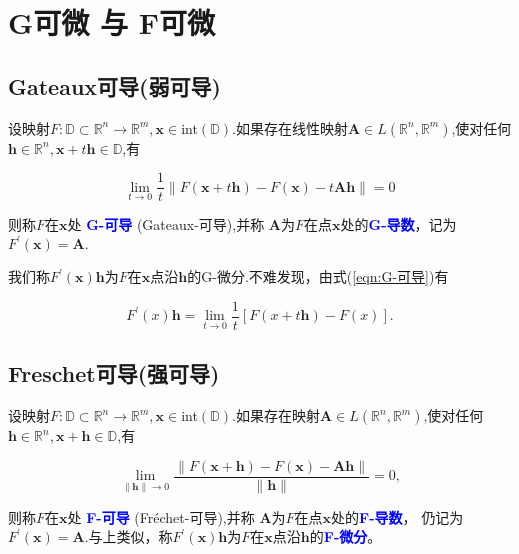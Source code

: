 \documentclass{lzureport}
\begin{document}
\section{G可微 与 F可微}
\subsection{Gateaux可导(弱可导)}
设映射$F:\mathbb{D}\subset\mathbb{R}^n\to\mathbb{R}^m,\boldsymbol{x}\in$int$(\mathbb{D}).$如果存在线性映射$\boldsymbol{A}\in L\left(\mathbb{R}^n,\mathbb{R}^m\right)$,使对任何$\boldsymbol{h}\in\mathbb{R}^n,\boldsymbol{x}+t\boldsymbol{h}\in\mathbb{D}$,有

\begin{equation}
\lim_{t\to0}\frac1t\|F(\boldsymbol{x}+t\boldsymbol{h})-F(\boldsymbol{x})-t\boldsymbol{Ah}\|=0
\end{equation}\label{eqn:G-可导}

则称$F$在$\boldsymbol x$处 \textcolor{blue}{\textbf{G-可导}} (Gateaux-可导),并称 \textcolor{YBXPurple}{$\boldsymbol A$为$F$在点$\boldsymbol x$处的}\textcolor{blue}{\textbf{G-导数}}，记为$F^\prime(\boldsymbol{x})=\boldsymbol{A}.$

我们称$F^\prime(\boldsymbol x)\boldsymbol{h}$为$F$在$\boldsymbol x$点沿$\boldsymbol h$的G-微分.不难发现，由式(\ref{eqn:G-可导})有

$$F^{\prime}(x)\boldsymbol{h}=\lim_{t\to0}\frac1t[F(x+t\boldsymbol{h})-F(x)].$$


\subsection{Freschet可导(强可导)}
设映射$F:\mathbb{D}\subset\mathbb{R}^n\to\mathbb{R}^m,\boldsymbol{x}\in$int$(\mathbb{D}).$如果存在映射$\boldsymbol{A}\in L\left(\mathbb{R}^n,\mathbb{R}^m\right)$,使对任何$\boldsymbol{h}\in\mathbb{R}^n,\boldsymbol{x}+\boldsymbol{h}\in\mathbb{D}$,有

\begin{equation}
\lim_{\|\boldsymbol{h}\|\to0}\frac{\|F(\boldsymbol{x}+\boldsymbol{h})-F(\boldsymbol{x})-\boldsymbol{Ah}\|}{\|\boldsymbol{h}\|}=0,
\end{equation}\label{eqn:F-可导}

则称$F$在$\boldsymbol x$处 \textcolor{blue}{\textbf{F-可导}} (Fréchet-可导),并称 \textcolor{YBXPurple}{$\boldsymbol A$为$F$在点$\boldsymbol x$处的}\textcolor{blue}{\textbf{F-导数}}，
仍记为$F^\prime(\boldsymbol{x})=\boldsymbol{A}.$与上类似，称$F^\prime(\boldsymbol{x})\boldsymbol{h}$为$F$在$\boldsymbol x$点沿$\boldsymbol h$的\textcolor{blue}{\textbf{F-微分}}。
\end{document}
